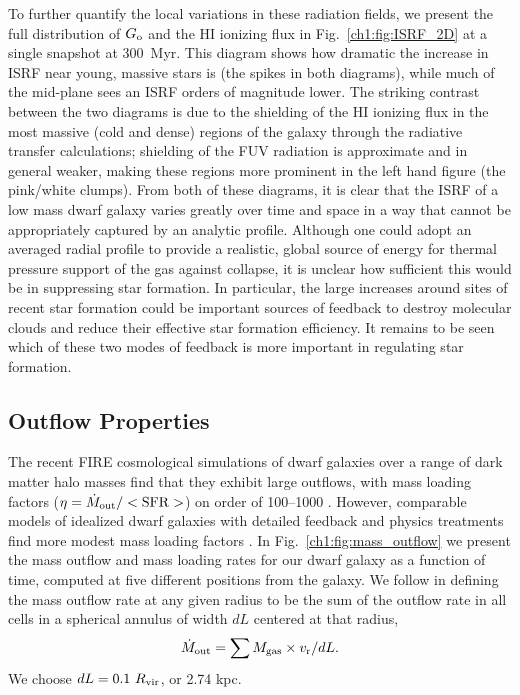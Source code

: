 To further quantify the local variations in these radiation fields, we present the full distribution of $G_{\rm o}$ and the HI ionizing flux in Fig.~\ref{ch1:fig:ISRF_2D} at a single snapshot at 300~Myr. This diagram shows how dramatic the increase in ISRF near young, massive stars is (the spikes in both diagrams), while much of the mid-plane sees an ISRF orders of magnitude lower. The striking contrast between the two diagrams is due to the shielding of the HI ionizing flux in the most massive (cold and dense) regions of the galaxy through the radiative transfer calculations; shielding of the FUV radiation is approximate and in general weaker, making these regions more prominent in the left hand figure (the pink/white clumps). From both of these diagrams, it is clear that the ISRF of a low mass dwarf galaxy varies greatly over time and space in a way that cannot be appropriately captured by an analytic profile. Although one could adopt an averaged radial profile to provide a realistic, global source of energy for thermal pressure support of the gas against collapse, it is unclear how sufficient this would be in suppressing star formation. In particular, the large increases around sites of recent star formation could be important sources of feedback to destroy molecular clouds and reduce their effective star formation efficiency. It remains to be seen which of these two modes of feedback is more important in regulating star formation.

\subsection{Outflow Properties}
\label{ch1:sec:outflows}

The recent FIRE cosmological simulations of dwarf galaxies over a range of dark matter halo masses find that they exhibit large outflows, with mass loading factors ($\eta = \dot{M}_{\rm out}/<\rm{SFR}>$) on order of 100--1000 \citep{Muratov2015}. However, comparable models of idealized dwarf galaxies with detailed feedback and physics treatments find more modest mass loading factors \citep{Hu2016,Hu2017}. In Fig.~\ref{ch1:fig:mass_outflow} we present the mass outflow and mass loading rates for our dwarf galaxy as a function of time, computed at five different positions from the galaxy. We follow \citet{Muratov2015} in defining the mass outflow rate at any given radius to be the sum of the outflow rate in all cells in a spherical annulus of width $dL$ centered at that radius,
\begin{equation} \label{eq:dotM}
\dot{M}_{\rm out} = \sum M_{\rm gas} \times v_{\rm r} / dL.
\end{equation}
We choose $dL = 0.1~R_{\rm vir}$, or 2.74 kpc.


